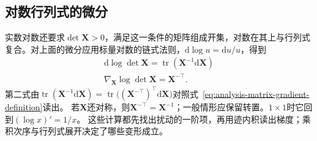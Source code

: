 \subsection{对数行列式的微分}
实数对数还要求$\det\bm X>0$，满足这一条件的矩阵组成开集，对数在其上与行列式复合。对上面的微分应用标量对数的链式法则，$\mathrm d\log u=\mathrm du/u$，得到
\begin{equation}
\begin{gathered}
\mathrm{d}\log\det\bm{X}
  =
  \operatorname{tr}(\bm{X}^{-1}\mathrm{d}\bm{X})\\
\nabla_{\bm{X}}\log\det\bm{X}
  =
  \bm{X}^{-\top}.
\end{gathered}
\label{eq:analysis-logdet-gradient}
\end{equation}
第二式由$\operatorname{tr}(\bm X^{-1}\mathrm d\bm X)=\operatorname{tr}\bigl((\bm X^{-\top})^\top\mathrm d\bm X\bigr)$对照式~\eqref{eq:analysis-matrix-gradient-definition}读出。
若$\bm X$还对称，则$\bm{X}^{-\top}=\bm{X}^{-1}$；一般情形应保留转置。$1\times1$时它回到$(\log x)'=1/x$。
这些计算都先找出扰动的一阶项，再用迹内积读出梯度；乘积次序与行列式展开决定了哪些变形成立。

